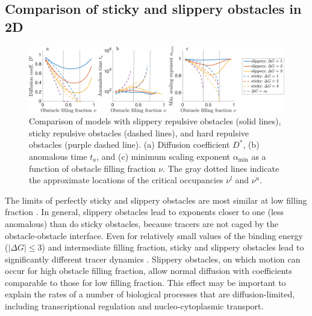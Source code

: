 \subsection{Comparison of sticky and slippery obstacles in 2D}
\begin{figure}[!hb]
  \begin{center}
	  \includegraphics[width=150mm]{figs/ch02_soft/soft_compare.png}
  \end{center}
	\caption[Comparision]
    {Comparison of models with slippery repulsive obstacles
    (solid lines), sticky repulsive obstacles (dashed lines), and hard
    repulsive obstacles (purple dashed line). (a) Diffusion
    coefficient $D^*$, (b) anomalous time $ t_a $, and (c) minimum
    scaling exponent $\alpha_{\min}$ as a function of obstacle filling
    fraction $\nu$.  The gray dotted lines indicate the
    approximate locations of the critical occupancies $ \nu^l $ and
    $ \nu^u $.}\label{fig:compare}
\end{figure}

The limits of perfectly sticky and slippery obstacles are most similar at low
filling fraction . In general, slippery obstacles lead to
exponents closer to one (less anomalous) than do sticky obstacles, because
tracers are not caged by the obstacle-obstacle interface.  Even for relatively
small values of the binding energy ($|\Delta G| \le 3$) and intermediate filling
fraction, sticky and slippery obstacles lead to significantly different tracer
dynamics . Slippery obstacles, on which motion can occur
for high obstacle filling fraction, allow normal diffusion with coefficients
comparable to those for low filling fraction. This effect may be important to
explain the rates of a number of biological processes that are
diffusion-limited, including transcriptional regulation and nucleo-cytoplasmic
transport.
